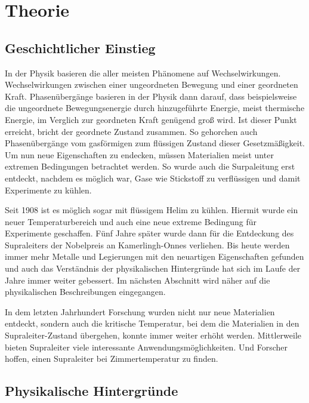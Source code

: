 \section{Theorie}
\label{sec:Theorie}
\subsection{Geschichtlicher Einstieg}
In der Physik basieren die aller meisten Ph\"anomene auf Wechselwir{\-}kun{\-}gen.
Wechselwir{\-}kun{\-}gen zwischen einer ungeordneten Bewegung und einer geordneten Kraft.
Phasen\"uberg\"ange basieren in der Physik dann darauf, dass beispielsweise die ungeordnete Bewegungsenergie durch hinzugef\"uhrte Energie, meist thermische Energie, im Verglich zur geordneten Kraft gen\"ugend gro{\ss} wird.
Ist dieser Punkt erreicht, bricht der geordnete Zustand zusammen.
So gehorchen auch Phasen\"uberg\"ange vom gasf\"ormigen zum fl\"ussigen Zustand dieser Gesetzm\"a{\ss}igkeit.
Um nun neue Eigenschaften zu endecken, m\"ussen Materialien meist unter extremen Bedingungen betrachtet werden.
So wurde auch die Surpaleitung erst entdeckt, nachdem es m\"oglich war, Gase wie Stickstoff zu verfl\"ussigen und damit Experimente zu k\"uhlen.

Seit 1908 ist es m\"oglich sogar mit fl\"ussigem Helim zu k\"uhlen.
Hiermit wurde ein neuer Temperaturbereich und auch eine neue extreme Bedingung f\"ur Experimente geschaffen.
F\"unf Jahre sp\"ater wurde dann f\"ur die Entdeckung des Supraleiters der Nobelpreis an Kamerlingh-Onnes verliehen.
Bis heute werden immer mehr Metalle und Legierungen mit den neuartigen Eigenschaften gefunden und auch das Verst\"andnis der physikalischen Hintergr\"unde hat sich im Laufe der Jahre immer weiter gebessert.
Im n\"achsten Abschnitt wird n\"aher auf die physikalischen Beschreibungen eingegangen.

In dem letzten Jahrhundert Forschung wurden nicht nur neue Materialien entdeckt, sondern auch die kritische Temperatur, bei dem die Materialien in den Supraleiter-Zustand \"ubergehen, konnte immer weiter erh\"oht werden.
Mittlerweile bieten Supraleiter viele interessante Anwendungsmöglichkeiten.
Und Forscher hoffen, einen Supraleiter bei Zimmertemperatur zu finden. 

\subsection{Physikalische Hintergr\"unde}
